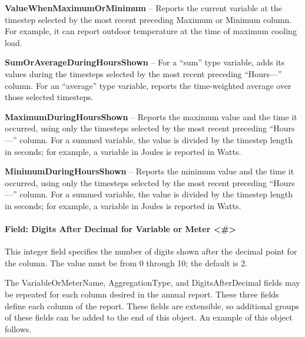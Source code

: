 \textbf{ValueWhenMaximumOrMinimum} -- Reports the current variable at the timestep selected by the most recent preceding Maximum or Minimum column. For example, it can report outdoor temperature at the time of maximum cooling load.

\textbf{SumOrAverageDuringHoursShown} -- For a ``sum'' type variable, adds its values during the timesteps selected by the most recent preceding ``Hours---'' column. For an ``average'' type variable, reports the time-weighted average over those selected timesteps.

\textbf{MaximumDuringHoursShown} -- Reports the maximum value and the time it occurred, using only the timesteps selected by the most recent preceding ``Hours---'' column. For a summed variable, the value is divided by the timestep length in seconds; for example, a variable in Joules is reported in Watts.

\textbf{MinimumDuringHoursShown} -- Reports the minimum value and the time it occurred, using only the timesteps selected by the most recent preceding ``Hours---'' column. For a summed variable, the value is divided by the timestep length in seconds; for example, a variable in Joules is reported in Watts.

\paragraph{Field: Digits After Decimal for Variable or Meter \textless{}\#\textgreater{}}\label{field-digits-after-decimal-for-variable-or-meter}

This integer field specifies the number of digits shown after the decimal point for the column. The value must be from 0 through 10; the default is 2.

The VariableOrMeterName, AggregationType, and DigitsAfterDecimal fields may be repeated for each column desired in the annual report. These three fields define each column of the report.  These fields are extensible, so additional groups of these fields can be added to the end of this object.  An example of this object follows.

